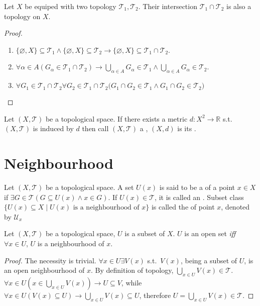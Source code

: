 \documentclass[openany]{book}
\begin{document}
\begin{theorem}
Let $X$ be equiped with two topology $\mathscr T_1, \mathscr T_2$. Their intersection $\mathscr T_1\cap \mathscr T_2$ is also a topology on $X$.
\end{theorem}
\begin{proof}
\begin{enumerate}[label=\alph*)]
\item $\{\varnothing, X\} \subseteq \mathscr T_1\wedge 
	\{\varnothing, X\} \subseteq  \mathscr T_2 \to 
		\{\varnothing, X\}\subseteq \mathscr T_1\cap \mathscr T_2$.
\item $\forall\alpha\in A(
		G_\alpha\in\mathscr T_1\cap \mathscr T_2)\to 
			\bigcup\limits_{\alpha\in A}G_\alpha\in\mathscr{T}_1 \wedge \bigcup\limits_{\alpha\in A}G_\alpha\in\mathscr{T}_2$. 
\item $\forall G_1\in \mathscr T_1\cap \mathscr T_2 \forall G_2 \in \mathscr T_1\cap \mathscr T_2 \big(
		G_1\cap G_2 \in \mathscr T_1 \wedge G_1\cap G_2\in\mathscr T_2\big)$			
\end{enumerate}
\end{proof}

\begin{definition}\label{matrization}
Let $(X, \mathscr T)$ be a topological space. If there exists a metric $d\colon X^2\to \mathbb R$ s.t.\ $(X, \mathscr T)$ is induced by $d$ then call $(X, \mathscr T)$ a , $(X, d)$ is its .
\end{definition}

\section{Neighbourhood}
\begin{definition}\label{neighbourhood}
Let $(X,\mathscr T)$ be a topological space. A set $U(x)$ is said to be a  of a point $x\in X$ if $\exists G\in \mathscr T(G\subseteq U(x)\wedge x\in G)$. 
If $U(x)\in \mathscr T$, it is called an .
Subset class $\{U(x)\subseteq X\mid U(x) \text{ is a neighbourhood of } x\}$ is called the  of point $x$, denoted by $\mathscr U_x$
\end{definition}

\begin{theorem}\label{open_iff_neighbourhood}
Let $(X,\mathscr T)$ be a topological space, $U$ is a subset of $X$. 
$U$ is an open set \emph{iff} $\forall x\in U$, $U$ is a neighbourhood of $x$.
\end{theorem}
\begin{proof}
The necessity is trivial. 
$\forall x\in U\exists V(x)$ s.t.\ $V(x)$, being a subset of $U$, is an open neighbourhood of $x$. 
By definition of topology, $\bigcup\limits_{ x\in U}V(x) \in \mathscr T$. 
$\forall x\in U( x\in \bigcup\limits_{ x\in U}V(x) ) \to U\subseteq V$, 
while $\forall x\in U (V( x)\subseteq U)\to \bigcup\limits_{ x\in U}V(x) \subseteq U$, 
therefore $U=\bigcup\limits_{ x\in U}V(x) \in \mathscr T$.
\end{proof}
\end{document}
